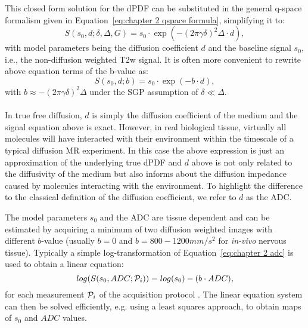 This closed form solution for the \gls{dPDF} can be substituted in the general q-space formalism given in Equation~\ref{eq:chapter 2 qspace formula}, simplifying it to:
\begin{equation}
	S(s_0,d;\delta,\Delta,G) = s_0 \cdot \exp(-(2\pi\gamma\delta)^2\Delta \cdot d),
\end{equation}
with model parameters being the diffusion coefficient $d$ and the baseline signal $s_0$, i.e., the non-diffusion weighted T2w signal. It is often more convenient to rewrite above equation terms of the b-value as: 
\begin{equation}
	S(s_0,d;b) = s_0 \cdot \exp(-b \cdot d),
\end{equation}
with $b  \approx -(2\pi\gamma\delta)^2\Delta$ under the \gls{SGP} assumption of $\delta \ll \Delta$.
\paragraph{}
In true free diffusion, $d$ is simply the diffusion coefficient of the medium and the signal equation above is exact. However, in real biological tissue, virtually all molecules will have interacted with their environment within the timescale of a typical diffusion MR experiment. In this case the above expression is just an approximation of the underlying true \gls{dPDF} and $d$ above is not only related to the diffusivity of the medium but also informs about the diffusion impedance caused by molecules interacting with the environment. To highlight the difference to the classical definition of the diffusion coefficient, we refer to $d$ as the \gls{ADC}.

The model parameters $s_0$ and the \gls{ADC} are tissue dependent and can be estimated by acquiring a minimum of two diffusion weighted images with different $b$-value (usually $b=0$ and $b=800-1200mm/s^2$ for \emph{in-vivo} nervous tissue). Typically a simple log-transformation of Equation~\ref{eq:chapter 2 adc} is used to obtain a linear equation:
\begin{equation}
	log(S(s_0,ADC;\mathcal{P}_i)) = log(s_{0}) - (b\cdot ADC),
    \label{eq:chapter 2 adc}
\end{equation}
for each measurement $\mathcal{P}_i$ of the acquisition protocol \prot{}. The linear equation system can then be solved efficiently, e.g. using a least squares approach, to obtain maps of $s_0$ and $ADC$ values.

